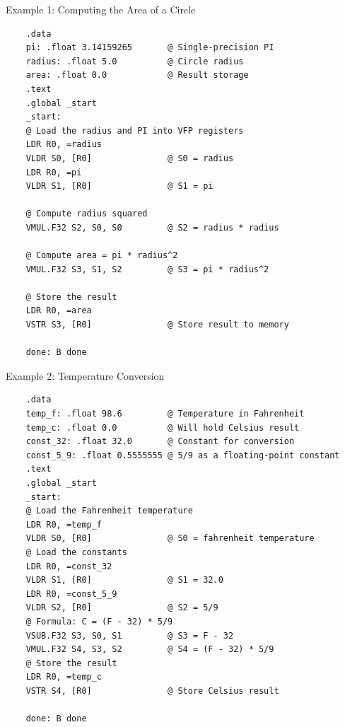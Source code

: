 \documentclass[aspectratio=169]{beamer}
\begin{document}
\begin{frame}[fragile]{Example 1: Computing the Area of a Circle}
\begin{verbatim}
    .data
    pi: .float 3.14159265       @ Single-precision PI
    radius: .float 5.0          @ Circle radius
    area: .float 0.0            @ Result storage
    .text
    .global _start
    _start:
    @ Load the radius and PI into VFP registers
    LDR R0, =radius
    VLDR S0, [R0]               @ S0 = radius
    LDR R0, =pi
    VLDR S1, [R0]               @ S1 = pi
    
    @ Compute radius squared
    VMUL.F32 S2, S0, S0         @ S2 = radius * radius
    
    @ Compute area = pi * radius^2
    VMUL.F32 S3, S1, S2         @ S3 = pi * radius^2
    
    @ Store the result
    LDR R0, =area
    VSTR S3, [R0]               @ Store result to memory
    
    done: B done
\end{verbatim}
\end{frame}

\begin{frame}[fragile]{Example 2: Temperature Conversion}
    \begin{verbatim}
    .data
    temp_f: .float 98.6         @ Temperature in Fahrenheit
    temp_c: .float 0.0          @ Will hold Celsius result
    const_32: .float 32.0       @ Constant for conversion
    const_5_9: .float 0.5555555 @ 5/9 as a floating-point constant
    .text
    .global _start
    _start:
    @ Load the Fahrenheit temperature
    LDR R0, =temp_f
    VLDR S0, [R0]               @ S0 = fahrenheit temperature
    @ Load the constants
    LDR R0, =const_32
    VLDR S1, [R0]               @ S1 = 32.0
    LDR R0, =const_5_9
    VLDR S2, [R0]               @ S2 = 5/9
    @ Formula: C = (F - 32) * 5/9
    VSUB.F32 S3, S0, S1         @ S3 = F - 32
    VMUL.F32 S4, S3, S2         @ S4 = (F - 32) * 5/9
    @ Store the result
    LDR R0, =temp_c
    VSTR S4, [R0]               @ Store Celsius result
    
    done: B done
    \end{verbatim}
\end{frame}
\end{document}
